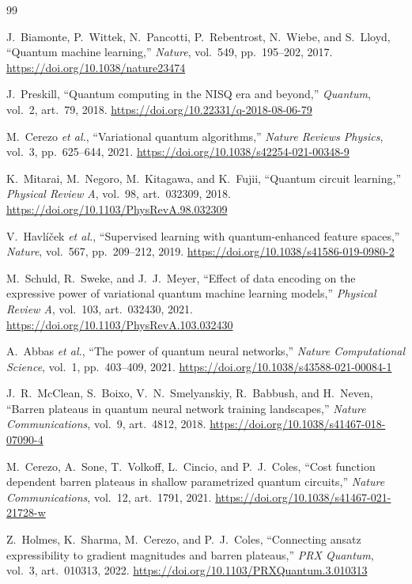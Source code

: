 \documentclass{article}
\begin{document}
\begin{thebibliography}{99}

J.~Biamonte, P.~Wittek, N.~Pancotti, P.~Rebentrost, N.~Wiebe, and S.~Lloyd, ``Quantum machine learning,'' \emph{Nature}, vol.~549, pp.~195--202, 2017. \url{https://doi.org/10.1038/nature23474}

J.~Preskill, ``Quantum computing in the NISQ era and beyond,'' \emph{Quantum}, vol.~2, art.~79, 2018. \url{https://doi.org/10.22331/q-2018-08-06-79}

M.~Cerezo \emph{et al.}, ``Variational quantum algorithms,'' \emph{Nature Reviews Physics}, vol.~3, pp.~625--644, 2021. \url{https://doi.org/10.1038/s42254-021-00348-9}

K.~Mitarai, M.~Negoro, M.~Kitagawa, and K.~Fujii, ``Quantum circuit learning,'' \emph{Physical Review A}, vol.~98, art.~032309, 2018. \url{https://doi.org/10.1103/PhysRevA.98.032309}

V.~Havl\'i\v{c}ek \emph{et al.}, ``Supervised learning with quantum-enhanced feature spaces,'' \emph{Nature}, vol.~567, pp.~209--212, 2019. \url{https://doi.org/10.1038/s41586-019-0980-2}

M.~Schuld, R.~Sweke, and J.~J.~Meyer, ``Effect of data encoding on the expressive power of variational quantum machine learning models,'' \emph{Physical Review A}, vol.~103, art.~032430, 2021. \url{https://doi.org/10.1103/PhysRevA.103.032430}

A.~Abbas \emph{et al.}, ``The power of quantum neural networks,'' \emph{Nature Computational Science}, vol.~1, pp.~403--409, 2021. \url{https://doi.org/10.1038/s43588-021-00084-1}

J.~R.~McClean, S.~Boixo, V.~N.~Smelyanskiy, R.~Babbush, and H.~Neven, ``Barren plateaus in quantum neural network training landscapes,'' \emph{Nature Communications}, vol.~9, art.~4812, 2018. \url{https://doi.org/10.1038/s41467-018-07090-4}

M.~Cerezo, A.~Sone, T.~Volkoff, L.~Cincio, and P.~J.~Coles, ``Cost function dependent barren plateaus in shallow parametrized quantum circuits,'' \emph{Nature Communications}, vol.~12, art.~1791, 2021. \url{https://doi.org/10.1038/s41467-021-21728-w}

Z.~Holmes, K.~Sharma, M.~Cerezo, and P.~J.~Coles, ``Connecting ansatz expressibility to gradient magnitudes and barren plateaus,'' \emph{PRX Quantum}, vol.~3, art.~010313, 2022. \url{https://doi.org/10.1103/PRXQuantum.3.010313}


\end{thebibliography}
\end{document}
